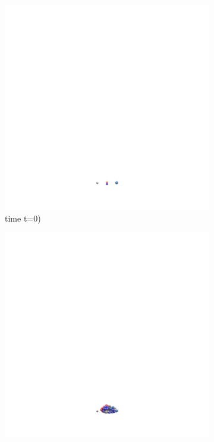 \documentclass[12pt,titlepage]{report}
\theoremstyle{definition}
\theoremstyle{remark}
\begin{document}
\begin{figure}[!ht]
\begin{subfigure}[b]{.5\textwidth}
\includegraphics[height=.4\textheight]{image1000001}
\caption{time t=0)}
\label{}
\end{subfigure}%
\begin{subfigure}[b]{.5\textwidth}
\includegraphics[height=.4\textheight]{image1000050}

\end{subfigure}
\end{figure}
\end{document}
